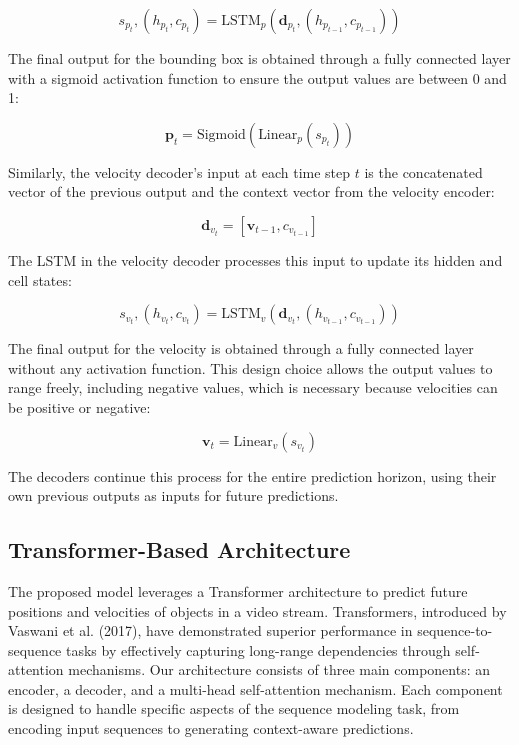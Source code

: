 \documentclass[12pt,oneside]{book} %
\begin{document}
\begin{equation}
    s_{p_t}, (h_{p_t}, c_{p_t}) = \text{LSTM}_p(\mathbf{d}_{p_t}, (h_{p_{t-1}}, c_{p_{t-1}}))
\end{equation}

The final output for the bounding box is obtained through a fully connected
layer with a sigmoid activation function to ensure the output values are
between 0 and 1:

\begin{equation}
    \mathbf{p}_t = \text{Sigmoid}(\text{Linear}_p(s_{p_t}))
\end{equation}

Similarly, the velocity decoder's input at each time step $t$ is the
concatenated vector of the previous output and the context vector from the
velocity encoder:

\begin{equation}
    \mathbf{d}_{v_t} = [\mathbf{v}_{t-1}, c_{v_{t-1}}]
\end{equation}

The LSTM in the velocity decoder processes this input to update its hidden and
cell states:

\begin{equation}
    s_{v_t}, (h_{v_t}, c_{v_t}) = \text{LSTM}_v(\mathbf{d}_{v_t}, (h_{v_{t-1}}, c_{v_{t-1}}))
\end{equation}

The final output for the velocity is obtained through a fully connected layer
without any activation function. This design choice allows the output values to
range freely, including negative values, which is necessary because velocities
can be positive or negative:

\begin{equation}
    \mathbf{v}_t = \text{Linear}_v(s_{v_t})
\end{equation}

The decoders continue this process for the entire prediction horizon, using
their own previous outputs as inputs for future predictions.

\subsection{Transformer-Based Architecture}

The proposed model leverages a Transformer architecture to predict future
positions and velocities of objects in a video stream. Transformers, introduced
by Vaswani et al. (2017), have demonstrated superior performance in
sequence-to-sequence tasks by effectively capturing long-range dependencies
through self-attention mechanisms. Our architecture consists of three main
components: an encoder, a decoder, and a multi-head self-attention mechanism.
Each component is designed to handle specific aspects of the sequence modeling
task, from encoding input sequences to generating context-aware predictions.
\end{document}
